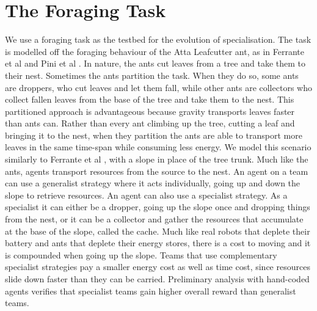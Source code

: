\documentclass[12pt]{article}
\begin{document}



\appendix
\section{The Foraging Task}

We use a foraging task as the testbed for the evolution of specialisation.
The task is modelled off the foraging behaviour of the Atta Leafcutter ant, as in Ferrante et al \cite{ferrante:PLOS_CB:2015} and Pini et al \cite{pini:Swarm_Intelligence:2011; pini:ICSI:2012}.
In nature, the ants cut leaves from a tree and take them to their nest. 
Sometimes the ants partition the task. 
When they do so, some ants are droppers, who cut leaves and let them fall, while other ants are collectors who collect fallen leaves from the base of the tree and take them to the nest.
This partitioned approach is advantageous because gravity transports leaves faster than ants can.
Rather than every ant climbing up the tree, cutting a leaf and bringing it to the nest, when they partition the ants are able to transport more leaves in the same time-span while consuming less energy.
We model this scenario similarly to Ferrante et al \cite{ferrante:PLOS_CB:2015}, with a slope in place of the tree trunk.
Much like the ants, agents transport resources from the source to the nest.
An agent on a team can use a generalist strategy where it acts individually, going up and down the slope to retrieve resources.
An agent can also use a specialist strategy. 
As a specialist it can either be a dropper, going up the slope once and dropping things from the nest, or it can be a collector and gather the resources that accumulate at the base of the slope, called the cache.
Much like real robots that deplete their battery and ants that deplete their energy stores, there is a cost to moving and it is compounded when going up the slope. 
Teams that use complementary specialist strategies pay a smaller energy cost as well as time cost, since resources slide down faster than they can be carried. 
Preliminary analysis with hand-coded agents verifies that specialist teams gain higher overall reward than generalist teams.\\
\end{document}
